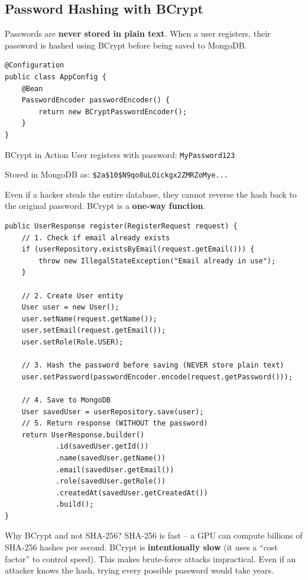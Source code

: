 \documentclass[11pt, a4paper]{article}
\begin{document}
\subsection{Password Hashing with BCrypt}

Passwords are \textbf{never stored in plain text}. When a user registers, their password is hashed using BCrypt before being saved to MongoDB.

\begin{lstlisting}[caption={AppConfig.java -- BCrypt Bean}]
@Configuration
public class AppConfig {
    @Bean
    PasswordEncoder passwordEncoder() {
        return new BCryptPasswordEncoder();
    }
}
\end{lstlisting}

\begin{examplebox}{BCrypt in Action}
User registers with password: \texttt{MyPassword123}

Stored in MongoDB as: \texttt{\$2a\$10\$N9qo8uLOickgx2ZMRZoMye...}

Even if a hacker steals the entire database, they cannot reverse the hash back to the original password. BCrypt is a \textbf{one-way function}.
\end{examplebox}

\begin{lstlisting}[caption={AuthService.java -- Registration (Hashing the Password)}]
public UserResponse register(RegisterRequest request) {
    // 1. Check if email already exists
    if (userRepository.existsByEmail(request.getEmail())) {
        throw new IllegalStateException("Email already in use");
    }

    // 2. Create User entity
    User user = new User();
    user.setName(request.getName());
    user.setEmail(request.getEmail());
    user.setRole(Role.USER);

    // 3. Hash the password before saving (NEVER store plain text)
    user.setPassword(passwordEncoder.encode(request.getPassword()));

    // 4. Save to MongoDB
    User savedUser = userRepository.save(user);
    // 5. Return response (WITHOUT the password)
    return UserResponse.builder()
            .id(savedUser.getId())
            .name(savedUser.getName())
            .email(savedUser.getEmail())
            .role(savedUser.getRole())
            .createdAt(savedUser.getCreatedAt())
            .build();
}
\end{lstlisting}

\begin{interviewbox}{Why BCrypt and not SHA-256?}
SHA-256 is fast -- a GPU can compute billions of SHA-256 hashes per second. BCrypt is \textbf{intentionally slow} (it uses a ``cost factor'' to control speed). This makes brute-force attacks impractical. Even if an attacker knows the hash, trying every possible password would take years.
\end{interviewbox}
\end{document}

